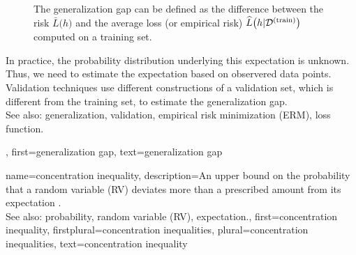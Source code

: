 {{{\begin{figure}[H]
\begin{center}
	\end{center}
	\caption{The generalization gap can be defined as 
	the difference between the 
	risk $\bar{L} \big( h \big) $ and the average loss (or empirical risk) 
	$\widehat{L}\big(h|\mathcal{D}^{(\rm train)}\big)$ computed on a training set.}
\end{figure}
	  In practice, the probability distribution underlying this expectation is 
	  unknown. Thus, we need to estimate the expectation based on 
	  observered data points. Validation techniques 
	  use different constructions of a validation set, which is different from 
	  the training set, to estimate the generalization gap.
		\\
		See also: generalization, validation, empirical risk minimization (ERM), loss function.}, 
	first={generalization gap}, 
	text={generalization gap}
} 
	
{name={concentration inequality}, 
	description={An upper bound on the probability that a random variable (RV) deviates 
		more than a prescribed amount from its expectation \cite{Wain2019}. 
		\\
		See also: probability, random variable (RV), expectation.}, 
	first={concentration inequality},
	firstplural={concentration inequalities},
	plural={concentration inequalities},  
	text={concentration inequality}
}


}
